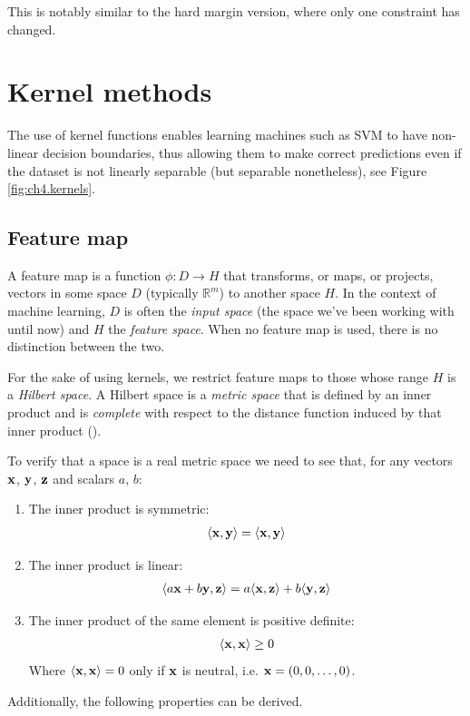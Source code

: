 This is notably similar to the hard margin version, where only one constraint has changed. 

\pagebreak

\section{Kernel methods}
\label{sec:ch4.kernels}

The use of kernel functions enables learning machines such as SVM to have non-linear decision boundaries, thus allowing them to make correct predictions even if the dataset is not linearly separable (but separable nonetheless), see Figure \ref{fig:ch4.kernels}.

\subsection{Feature map}

A feature map is a function $\phi : D \rightarrow H$ that transforms, or maps, or projects, vectors in some space $D$ (typically $\mathbb{R}^m$) to another space $H$. In the context of machine learning, $D$ is often the \emph{input space} (the space we've been working with until now) and $H$ the \emph{feature space}. When no feature map is used, there is no distinction between the two.

For the sake of using kernels, we restrict feature maps to those whose range $H$ is a \emph{Hilbert space}. A Hilbert space is a \emph{metric space} that is defined by an inner product and is \emph{complete} with respect to the distance function induced by that inner product (\cite{noauthor_wikipedia_2021-1}).

To verify that a space is a real metric space we need to see that, for any vectors $\mathbf{x}$, $\mathbf{y}$, $\mathbf{z}$ and scalars $a$, $b$:

\begin{enumerate}
    \item The inner product is symmetric:
    \begin{align*}
        \langle\mathbf{x}, \mathbf{y}\rangle = \langle\mathbf{x}, \mathbf{y}\rangle
    \end{align*}
    \item The inner product is linear:
    \begin{align*}
        \langle a\mathbf{x} + b\mathbf{y}, \mathbf{z}\rangle = a\langle\mathbf{x}, \mathbf{z}\rangle + b\langle\mathbf{y}, \mathbf{z}\rangle 
    \end{align*}
    \item The inner product of the same element is positive definite:
    \begin{align*}
        \langle\mathbf{x}, \mathbf{x}\rangle \ge 0
    \end{align*}
    Where $\langle\mathbf{x}, \mathbf{x}\rangle = 0$ only if $\mathbf{x}$ is neutral, i.e. $\mathbf{x} = (0,0,\dots, 0)$. \\
\end{enumerate}
Additionally, the following properties can be derived.

